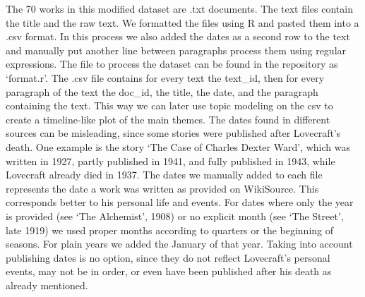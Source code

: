 The 70 works in this modified dataset are .txt documents. The text files contain the 
title and the raw text. We formatted the files using R and pasted them into a .csv 
format. In this process we also added the dates as a second row to the text and manually 
put another line between paragraphs process them using regular expressions. The file to 
process the dataset can be found in the repository as ‘format.r’. The .csv file contains 
for every text the text\_id, then for every paragraph of the text the doc\_id, the title, 
the date, and the paragraph containing the text. This way we can later use topic modeling 
on the csv to create a timeline-like plot of the main themes. The dates found in different 
sources can be misleading, since some stories were published after Lovecraft’s death. 
One example is the story ‘The Case of Charles Dexter Ward’, which was written in 1927, 
partly published in 1941, and fully published in 1943, while Lovecraft already died in 
1937. The dates we manually added to each file represents the date a work was written 
as provided on WikiSource. This corresponds better to his personal life and events. 
For dates where only the year is provided (see ‘The Alchemist’, 1908) or no explicit 
month (see ‘The Street’, late 1919) we used proper months according to quarters or the 
beginning of seasons. For plain years we added the January of that year. Taking into 
account publishing dates is no option, since they do not reflect Lovecraft’s personal 
events, may not be in order, or even have been published after his death as already 
mentioned.\\


